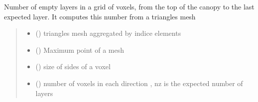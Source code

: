 \documentclass[letterpaper,10pt,english]{sphinxmanual}
\begin{document}

\begin{fulllineitems}
\label{\detokenize{reference:voxelsmesh.reduce_layers_from_trimesh}}
\pysigstartsignatures
{}
\pysigstopsignatures
\sphinxAtStartPar
Number of empty layers in a grid of voxels, from the top of the canopy to the last expected layer.
It computes this number from a triangles mesh
\begin{quote}\begin{description}
\begin{itemize}
\item {} 
\sphinxAtStartPar
{} () \textendash{} 
\sphinxAtStartPar
triangles mesh aggregated by indice elements

\begin{sphinxVerbatim}[commandchars=\\\{\}]
   \PYG{p}{[}  \PYG{p}{]}
\end{sphinxVerbatim}


\item {} 
\sphinxAtStartPar
{} () \textendash{} Maximum point of a mesh \sphinxcode{\sphinxupquote{{[}x, y, z{]}}}

\item {} 
\sphinxAtStartPar
{} () \textendash{} size of sides of a voxel \sphinxcode{\sphinxupquote{{[}dx, dy, dz{]}}}

\item {} 
\sphinxAtStartPar
{} () \textendash{} number of voxels in each direction \sphinxcode{\sphinxupquote{{[}nx, ny, nz{]}}}, nz is the expected number of layers


\end{itemize}
\end{description}
\end{quote}
\end{fulllineitems}
\end{document}
